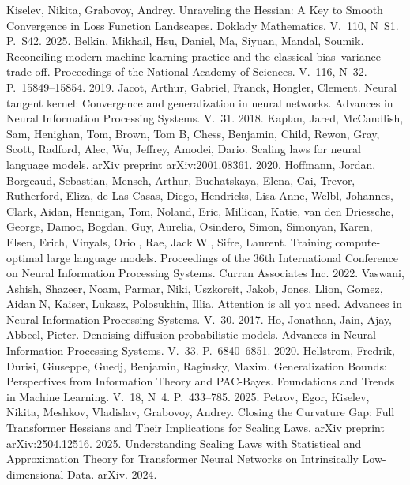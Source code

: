  Kiselev, Nikita, Grabovoy, Andrey. Unraveling the Hessian: A Key to Smooth Convergence in Loss Function Landscapes. Doklady Mathematics. V.~110, N~S1. P.~S42. 2025.
 Belkin, Mikhail, Hsu, Daniel, Ma, Siyuan, Mandal, Soumik. Reconciling modern machine-learning practice and the classical bias--variance trade-off. Proceedings of the National Academy of Sciences. V.~116, N~32. P.~15849--15854. 2019.
 Jacot, Arthur, Gabriel, Franck, Hongler, Clement. Neural tangent kernel: Convergence and generalization in neural networks. Advances in Neural Information Processing Systems. V.~31. 2018.
 Kaplan, Jared, McCandlish, Sam, Henighan, Tom, Brown, Tom B, Chess, Benjamin, Child, Rewon, Gray, Scott, Radford, Alec, Wu, Jeffrey, Amodei, Dario. Scaling laws for neural language models. arXiv preprint arXiv:2001.08361. 2020.
 Hoffmann, Jordan, Borgeaud, Sebastian, Mensch, Arthur, Buchatskaya, Elena, Cai, Trevor, Rutherford, Eliza, de Las Casas, Diego, Hendricks, Lisa Anne, Welbl, Johannes, Clark, Aidan, Hennigan, Tom, Noland, Eric, Millican, Katie, van den Driessche, George, Damoc, Bogdan, Guy, Aurelia, Osindero, Simon, Simonyan, Karen, Elsen, Erich, Vinyals, Oriol, Rae, Jack W., Sifre, Laurent. Training compute-optimal large language models. Proceedings of the 36th International Conference on Neural Information Processing Systems. Curran Associates Inc. 2022.
 Vaswani, Ashish, Shazeer, Noam, Parmar, Niki, Uszkoreit, Jakob, Jones, Llion, Gomez, Aidan N, Kaiser, Lukasz, Polosukhin, Illia. Attention is all you need. Advances in Neural Information Processing Systems. V.~30. 2017.
 Ho, Jonathan, Jain, Ajay, Abbeel, Pieter. Denoising diffusion probabilistic models. Advances in Neural Information Processing Systems. V.~33. P.~6840--6851. 2020.
 Hellstrom, Fredrik, Durisi, Giuseppe, Guedj, Benjamin, Raginsky, Maxim. Generalization Bounds: Perspectives from Information Theory and PAC-Bayes. Foundations and Trends in Machine Learning. V.~18, N~4. P.~433--785. 2025.
 Petrov, Egor, Kiselev, Nikita, Meshkov, Vladislav, Grabovoy, Andrey. Closing the Curvature Gap: Full Transformer Hessians and Their Implications for Scaling Laws. arXiv preprint arXiv:2504.12516. 2025.
 Understanding Scaling Laws with Statistical and Approximation Theory for Transformer Neural Networks on Intrinsically Low-dimensional Data. arXiv. 2024.
